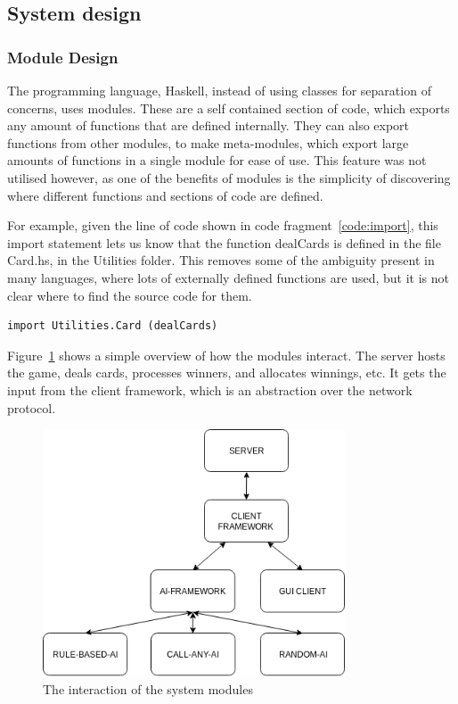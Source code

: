 \newpage{}

\subsection{System design}

\subsubsection{Module Design}

The programming language, Haskell, instead of using classes for separation
of concerns, uses modules. These are a self contained section of code, which
exports any amount of functions that are defined internally. They can also
export functions from other modules, to make meta-modules, which export
large amounts of functions in a single module for ease of use. This feature
was not utilised however, as one of the benefits of modules is the simplicity
of discovering where different functions and sections of code are defined.

For example, given the line of code shown in code fragment~\ref{code:import}, this
import statement lets us know that the function dealCards is defined in the
file Card.hs, in the Utilities folder. This removes some of the ambiguity
present in many languages, where lots of externally defined functions are
used, but it is not clear where to find the source code for them.

\vspace{0.3cm}

\begin{lstlisting}[label={code:import}, caption=An example import statement]
import Utilities.Card (dealCards)
\end{lstlisting}

Figure~\ref{fig:interoper} shows a simple overview of how the modules interact.
The server hosts the game, deals cards, processes winners, and allocates
winnings, etc. It gets the input from the client framework, which is an
abstraction over the network protocol.

\begin{figure}[H]
    \centering
    \includegraphics[width=0.8\textwidth]{../images/interoper.png}
    \caption{The interaction of the system modules}%
    \label{fig:interoper}
\end{figure}

